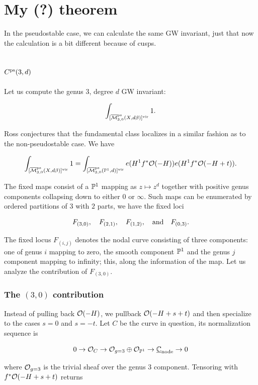 \documentclass[12pt]{memoir}
\author{\nauthor}
\begin{document}
\section{My (?) theorem}

In the pseudostable case, we can calculate the same GW invariant, just that now the calculation is a bit different because of cusps.

\subsection{\(C^{\operatorname{\mathrm{ps}}}(3,d)\)}

Let us compute the genus 3, degree \(d\) GW invariant:

\[\int_{[\overline{\mathcal{M}}^\text{ps}_{3,0}(X,d\beta)]^{\mathrm{vir}}}1.\]

Ross \cite{DustyNotes} conjectures that the fundamental class localizes in a similar fashion as to the non-pseudostable case. We have

\[\int_{[\overline{\mathcal{M}}^\text{ps}_{3,0}(X,d\beta)]^{\mathrm{vir}}}1=\int_{[\overline{\mathcal{M}}^\text{ps}_{3,0}(\mathbb{P}^1,d)]^{\mathrm{vir}}}e(H^1f^\ast\mathcal{O}(-H))e(H^1f^\ast\mathcal{O}(-H+t)).\]

The fixed maps consist of a \(\mathbb{P}^1\) mapping as \(z\mapsto z^d\) together with positive genus components collapsing down to either \(0\) or \(\infty\). Such maps can be enumerated by ordered partitions of \(3\) with \(2\) parts, we have the fixed loci

\[F_{(3,0)},\quad F_{(2,1)},\quad F_{(1,2)},\quad\text{and}\quad F_{(0,3)}.\]

The fixed locus \(F_{(i,j)}\) denotes the nodal curve consisting of three components: one of genus \(i\) mapping to zero, the smooth component \(\mathbb{P}^1\) and the genus \(j\) component mapping to infinity; this, along the information of the map. Let us analyze the contribution of \(F_{(3,0)}\).

\subsubsection{The \((3,0)\) contribution}

Instead of pulling back \(\mathcal{O}(-H)\), we pullback \(\mathcal{O}(-H+s+t)\) and then specialize to the cases \(s=0\) and \(s=-t\). Let \(C\) be the curve in question, its normalization sequence is

\[0\to\mathcal{O}_C\to \mathcal{O}_{g=3}\oplus\mathcal{O}_{\mathbb{P}^1}\to\underline{\mathbb{C}}_{\text{node}}\to 0\]

where \(\mathcal{O}_{g=3}\) is the trivial sheaf over the genus 3 component. Tensoring with \(f^\ast\mathcal{O}(-H+s+t)\) returns
\end{document}
